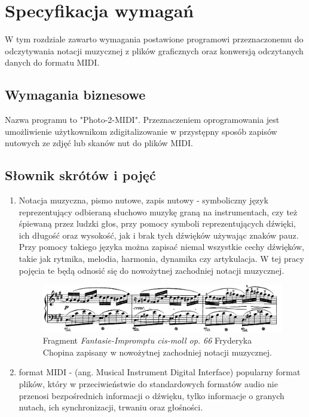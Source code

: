 \chapter{Specyfikacja wymagań}
W tym rozdziale zawarto wymagania postawione programowi przeznaczonemu do odczytywania notacji muzycznej z plików graficznych oraz konwersją odczytanych danych do formatu MIDI.

\section{Wymagania biznesowe}
Nazwa programu to "Photo-2-MIDI". Przeznaczeniem oprogramowania jest umożliwienie użytkownikom zdigitalizowanie w przystępny sposób zapisów nutowych ze zdjęć lub skanów nut do plików MIDI.

\section{Słownik skrótów i pojęć}

	\begin{enumerate}
		\item Notacja muzyczna, pismo nutowe, zapis nutowy - symboliczny język reprezentujący odbieraną słuchowo muzykę graną na instrumentach, czy też śpiewaną przez ludzki głos, przy pomocy symboli reprezentujących dźwięki, ich długość oraz wysokość, jak i brak tych dźwięków używając znaków pauz. Przy pomocy takiego języka można zapisać niemal wszystkie cechy dźwięków, takie jak rytmika, melodia, harmonia, dynamika czy artykulacja. W tej pracy pojęcia te będą odnosić się do nowożytnej zachodniej notacji muzycznej.
		
		\begin{figure}
			\centering
			\includegraphics[width=14cm]{images/chopin_fastasie_impromtu_no_4_op_66.png}
			\caption{Fragment \textit{Fantasie-Impromptu cis-moll op. 66} Fryderyka Chopina zapisany w nowożytnej zachodniej notacji muzycznej. }
			\label{fig:chopin_impromptu}
		\end{figure}
		
		\item format MIDI - (ang. Musical Instrument Digital Interface) popularny format plików, który w przeciwieństwie do standardowych formatów audio nie przenosi bezpośrednich informacji o dźwięku, tylko informacje o granych nutach, ich synchronizacji, trwaniu oraz głośności. 
	\end{enumerate}

